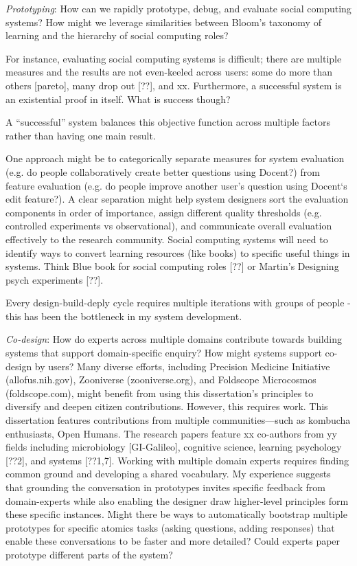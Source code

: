 \textit{Prototyping}: How can we rapidly prototype, debug, and evaluate social computing systems? How might we leverage similarities between Bloom’s taxonomy of learning and the hierarchy of social computing roles?

For instance, evaluating social computing systems is difficult; there are multiple measures and the results are not even-keeled across users: some do more than others [pareto], many drop out [??], and xx. Furthermore, a successful system is an existential proof in itself. What is success though?

A “successful” system balances this objective function across multiple factors rather than having one main result. 

One approach might be to categorically separate measures for system evaluation (e.g. do people collaboratively create better questions using Docent?) from feature evaluation (e.g. do people improve another user’s question using Docent‘s edit feature?). A clear separation might help system designers sort the evaluation components in order of importance, assign different quality thresholds (e.g. controlled experiments vs observational), and communicate overall evaluation effectively to the research community.
Social computing systems will need to identify ways to convert learning resources (like books) to specific useful things in systems. Think Blue book for social computing roles [??] or Martin’s Designing psych experiments [??]. 

Every design-build-deply cycle requires multiple iterations with groups of people - this has been the bottleneck in my system development. 

\textit{Co-design}: How do experts across multiple domains contribute towards building systems that support domain-specific enquiry? How might systems support co-design by users?
Many diverse efforts, including Precision Medicine Initiative (allofus.nih.gov), Zooniverse (zooniverse.org), and Foldscope Microcosmos (foldscope.com), might benefit from using this dissertation’s principles to diversify and deepen citizen contributions. However, this requires work. This dissertation features contributions from multiple communities—such as kombucha enthusiasts, Open Humans. The research papers feature xx co-authors from yy fields including microbiology [GI-Galileo], cognitive science, learning psychology [??2], and systems [??1,7]. Working with multiple domain experts requires finding common ground and developing a shared vocabulary. My experience suggests that grounding the conversation in prototypes invites specific feedback from domain-experts while also enabling the designer draw higher-level principles form these specific instances. Might there be ways to automatically bootstrap multiple prototypes for specific atomics tasks (asking questions, adding responses) that enable these conversations to be faster and more detailed? Could experts paper prototype different parts of the system?

